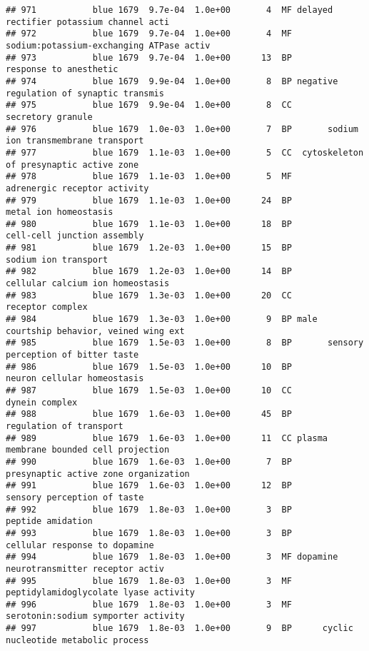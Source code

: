 \documentclass[]{article}
\begin{document}
\begin{verbatim}
## 971           blue 1679  9.7e-04  1.0e+00       4  MF delayed rectifier potassium channel acti
## 972           blue 1679  9.7e-04  1.0e+00       4  MF sodium:potassium-exchanging ATPase activ
## 973           blue 1679  9.7e-04  1.0e+00      13  BP                   response to anesthetic
## 974           blue 1679  9.9e-04  1.0e+00       8  BP negative regulation of synaptic transmis
## 975           blue 1679  9.9e-04  1.0e+00       8  CC                        secretory granule
## 976           blue 1679  1.0e-03  1.0e+00       7  BP       sodium ion transmembrane transport
## 977           blue 1679  1.1e-03  1.0e+00       5  CC  cytoskeleton of presynaptic active zone
## 978           blue 1679  1.1e-03  1.0e+00       5  MF             adrenergic receptor activity
## 979           blue 1679  1.1e-03  1.0e+00      24  BP                    metal ion homeostasis
## 980           blue 1679  1.1e-03  1.0e+00      18  BP              cell-cell junction assembly
## 981           blue 1679  1.2e-03  1.0e+00      15  BP                     sodium ion transport
## 982           blue 1679  1.2e-03  1.0e+00      14  BP         cellular calcium ion homeostasis
## 983           blue 1679  1.3e-03  1.0e+00      20  CC                         receptor complex
## 984           blue 1679  1.3e-03  1.0e+00       9  BP male courtship behavior, veined wing ext
## 985           blue 1679  1.5e-03  1.0e+00       8  BP       sensory perception of bitter taste
## 986           blue 1679  1.5e-03  1.0e+00      10  BP              neuron cellular homeostasis
## 987           blue 1679  1.5e-03  1.0e+00      10  CC                           dynein complex
## 988           blue 1679  1.6e-03  1.0e+00      45  BP                  regulation of transport
## 989           blue 1679  1.6e-03  1.0e+00      11  CC plasma membrane bounded cell projection 
## 990           blue 1679  1.6e-03  1.0e+00       7  BP     presynaptic active zone organization
## 991           blue 1679  1.6e-03  1.0e+00      12  BP              sensory perception of taste
## 992           blue 1679  1.8e-03  1.0e+00       3  BP                        peptide amidation
## 993           blue 1679  1.8e-03  1.0e+00       3  BP            cellular response to dopamine
## 994           blue 1679  1.8e-03  1.0e+00       3  MF dopamine neurotransmitter receptor activ
## 995           blue 1679  1.8e-03  1.0e+00       3  MF    peptidylamidoglycolate lyase activity
## 996           blue 1679  1.8e-03  1.0e+00       3  MF      serotonin:sodium symporter activity
## 997           blue 1679  1.8e-03  1.0e+00       9  BP      cyclic nucleotide metabolic process

\end{verbatim}
\end{document}
